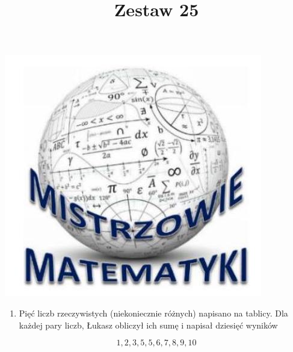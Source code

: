 \documentclass[10pt]{article}
\title{Zestaw 25 }
\author{}
\date{}
\begin{document}
\maketitle
\begin{center}
\includegraphics[max width=\textwidth]{2024_11_21_8c76d2422a3a02e654d7g-1(1)}
\end{center}

\begin{enumerate}
  \item Pięć liczb rzeczywistych (niekoniecznie różnych) napisano na tablicy. Dla każdej pary liczb, Łukasz obliczył ich sumę i napisał dziesięć wyników
\end{enumerate}

\[
1,2,3,5,5,6,7,8,9,10
\]
\end{document}
